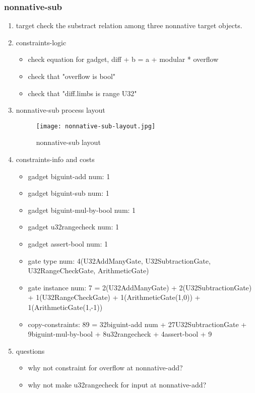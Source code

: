 \subsubsection{nonnative-sub}
\label{nonnative-sub}

\begin{enumerate}
    \item target
        check the substract relation among three nonnative target objects.
    \item constraints-logic
        \begin{itemize}
            \item check equation for gadget,  diff + b = a + modular * overflow
            \item check that "overflow is bool"
            \item check that "diff.limbs is range U32"
        \end{itemize}
    \item nonnative-sub process layout
        \begin{figure}[!ht]
            \centering
            \texttt{[image: nonnative-sub-layout.jpg]}
            \caption{nonnative-sub layout}
            \label{fig:nonnative-sub-layout}
        \end{figure}
    
    \item constraints-info and costs
        \begin{itemize}
            \item gadget biguint-add num: 1
            \item gadget biguint-sub num: 1
            \item gadget biguint-mul-by-bool num: 1
            \item gadget u32rangecheck num: 1
            \item gadget assert-bool num: 1
            \item gate type num: 4(U32AddManyGate, U32SubtractionGate, U32RangeCheckGate, ArithmeticGate)
            \item gate instance num: 7 = 2(U32AddManyGate) + 2(U32SubtractionGate) + 1(U32RangeCheckGate) + 1(ArithmeticGate(1,0)) + 1(ArithmeticGate(1,-1))
            \item copy-constraints: 89 = 32{biguint-add num} + 27{U32SubtractionGate} + 9{biguint-mul-by-bool} + 8{u32rangecheck} + 4{assert-bool} + 9
        \end{itemize}

    \item questions
        \begin{itemize}
            \item why not constraint for overflow at nonnative-add?
            \item why not make u32rangecheck for input at nonnative-add?
        \end{itemize}

\end{enumerate}